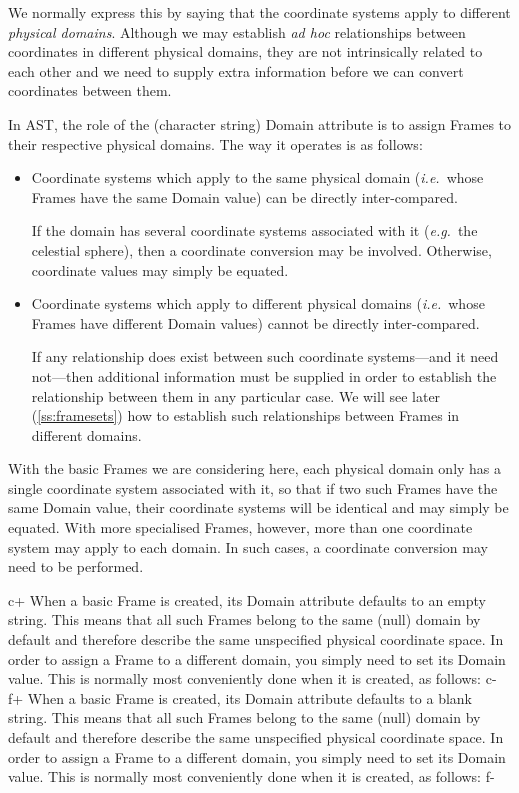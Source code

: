 \documentclass[twoside,11pt]{article}
\newcommand{\secref}[1]{\S\ref{#1}}
\renewcommand{\secref}[1]{\ref{#1}}
\begin{document}
We normally express this by saying that the coordinate systems apply
to different {\em{physical domains}}. Although we may establish
{\em{ad hoc}} relationships between coordinates in different physical
domains, they are not intrinsically related to each other and we need
to supply extra information before we can convert coordinates between
them.

In AST, the role of the (character string) Domain attribute is to
assign Frames to their respective physical domains. The way it
operates is as follows:

\begin{itemize}
\item Coordinate systems which apply to the same physical domain
({\em{i.e.}}\ whose Frames have the same Domain value) can be directly
inter-compared.

If the domain has several coordinate systems associated with it
({\em{e.g.}}\ the celestial sphere), then a coordinate conversion may
be involved. Otherwise, coordinate values may simply be equated.

\item Coordinate systems which apply to different physical domains
({\em{i.e.}}\ whose Frames have different Domain values) cannot be
directly inter-compared.

If any relationship does exist between such coordinate systems---and
it need not---then additional information must be supplied in order to
establish the relationship between them in any particular case. We
will see later (\secref{ss:framesets}) how to establish such
relationships between Frames in different domains.
\end{itemize}

With the basic Frames we are considering here, each physical domain
only has a single coordinate system associated with it, so that if two
such Frames have the same Domain value, their coordinate systems will
be identical and may simply be equated. With more specialised Frames,
however, more than one coordinate system may apply to each domain. In
such cases, a coordinate conversion may need to be performed.

c+
When a basic Frame is created, its Domain attribute defaults to an
empty string. This means that all such Frames belong to the same
(null) domain by default and therefore describe the same unspecified
physical coordinate space. In order to assign a Frame to a different
domain, you simply need to set its Domain value. This is normally most
conveniently done when it is created, as follows:
c-
f+
When a basic Frame is created, its Domain attribute defaults to a
blank string. This means that all such Frames belong to the same
(null) domain by default and therefore describe the same unspecified
physical coordinate space. In order to assign a Frame to a different
domain, you simply need to set its Domain value. This is normally most
conveniently done when it is created, as follows:
f-
\end{document}
